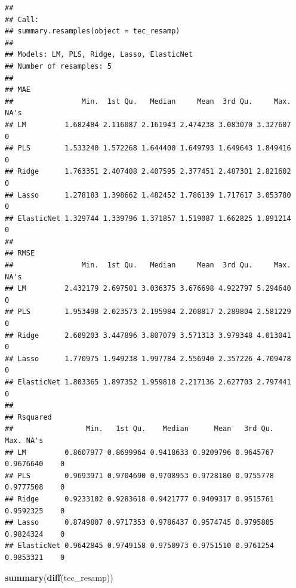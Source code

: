 \documentclass[
  11pt,
]{article}
\newenvironment{Shaded}{\begin{snugshade}}{\end{snugshade}}
\newcommand{\FunctionTok}[1]{\textcolor[rgb]{0.13,0.29,0.53}{\textbf{#1}}}
\newcommand{\NormalTok}[1]{#1}
\begin{document}
\begin{verbatim}
## 
## Call:
## summary.resamples(object = tec_resamp)
## 
## Models: LM, PLS, Ridge, Lasso, ElasticNet 
## Number of resamples: 5 
## 
## MAE 
##                Min.  1st Qu.   Median     Mean  3rd Qu.     Max. NA's
## LM         1.682484 2.116087 2.161943 2.474238 3.083070 3.327607    0
## PLS        1.533240 1.572268 1.644400 1.649793 1.649643 1.849416    0
## Ridge      1.763351 2.407408 2.407595 2.377451 2.487301 2.821602    0
## Lasso      1.278183 1.398662 1.482452 1.786139 1.717617 3.053780    0
## ElasticNet 1.329744 1.339796 1.371857 1.519087 1.662825 1.891214    0
## 
## RMSE 
##                Min.  1st Qu.   Median     Mean  3rd Qu.     Max. NA's
## LM         2.432179 2.697501 3.036375 3.676698 4.922797 5.294640    0
## PLS        1.953498 2.023573 2.195984 2.208817 2.289804 2.581229    0
## Ridge      2.609203 3.447896 3.807079 3.571313 3.979348 4.013041    0
## Lasso      1.770975 1.949238 1.997784 2.556940 2.357226 4.709478    0
## ElasticNet 1.803365 1.897352 1.959818 2.217136 2.627703 2.797441    0
## 
## Rsquared 
##                 Min.   1st Qu.    Median      Mean   3rd Qu.      Max. NA's
## LM         0.8607977 0.8699964 0.9418633 0.9209796 0.9645767 0.9676640    0
## PLS        0.9693971 0.9704690 0.9708953 0.9728180 0.9755778 0.9777508    0
## Ridge      0.9233102 0.9283618 0.9421777 0.9409317 0.9515761 0.9592325    0
## Lasso      0.8749807 0.9717353 0.9786437 0.9574745 0.9795805 0.9824324    0
## ElasticNet 0.9642845 0.9749158 0.9750973 0.9751510 0.9761254 0.9853321    0
\end{verbatim}

\begin{Shaded}
\begin{Highlighting}[]
\FunctionTok{summary}\NormalTok{(}\FunctionTok{diff}\NormalTok{(tec\_resamp))}
\end{Highlighting}
\end{Shaded}
\end{document}
